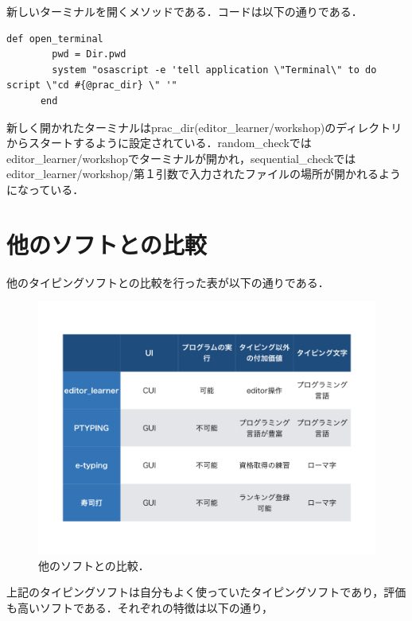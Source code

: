 \documentclass[11pt,dvipdfmx]{jsarticle}
\begin{document}
新しいターミナルを開くメソッドである．コードは以下の通りである．

\begin{verbatim}
def open_terminal
        pwd = Dir.pwd
        system "osascript -e 'tell application \"Terminal\" to do script \"cd #{@prac_dir} \" '"
      end
\end{verbatim}

新しく開かれたターミナルはprac\_dir(editor\_learner/workshop)のディレクトリからスタートするように設定されている．random\_checkではeditor\_learner/workshopでターミナルが開かれ，sequential\_checkではeditor\_learner/workshop/第１引数で入力されたファイルの場所が開かれるようになっている．

    \section{他のソフトとの比較}\label{ux4ed6ux306eux30bdux30d5ux30c8ux3068ux306eux6bd4ux8f03}

    他のタイピングソフトとの比較を行った表が以下の通りである．

\begin{figure}[H]
\centering
\begin{center}
\includegraphics[width=150mm]{../../picture/compare.jpeg}
\end{center}
\caption{他のソフトとの比較．\label{compare}}

\label{fig:}
\end{figure}

上記のタイピングソフトは自分もよく使っていたタイピングソフトであり，評価も高いソフトである．それぞれの特徴は以下の通り，
\end{document}
